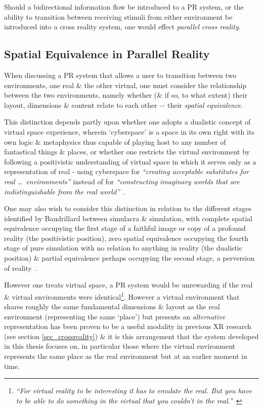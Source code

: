 Should a bidirectional information flow be introduced to a PR system, or the ability to transition between receiving stimuli from either environment be introduced into a cross reality system, one would effect \textit{parallel cross reality}.

\subsection{Spatial Equivalence in Parallel Reality}

\newcommand{\turklevrfootnote}{\footnote{\textit{``For virtual reality to be interesting it has to emulate the real. But you have to be able to do something in the virtual that you couldn't in the real.''}~\cite{Turkle1997}}}

When discussing a PR system that allows a user to transition between two environments, one real \& the other virtual, one must consider the relationship between the two environments, namely whether (\& if so, to what extent) their layout, dimensions \& content relate to each other $-$ their \textit{spatial equivalence}.

This distinction depends partly upon whether one adopts a dualistic concept of virtual space experience, wherein `cyberspace' is a space in its own right with its own logic \& metaphysics thus capable of playing host to any number of fantastical things \& places, or whether one restricts the virtual environment by following a positivistic understanding of virtual space in which it serves only as a representation of real - using cyberspace for \textit{``creating acceptable substitutes for real \ldots\ environments''} instead of for \textit{``constructing imaginary worlds that are indistinguishable from the real world''}~\cite{Qvortrup2002}.

One may also wish to consider this distinction in relation to the different stages identified by Baudrillard between simulacra \& simulation, with complete spatial equivalence occupying the first stage of a faithful image or copy of a profound reality (the positivistic position), zero spatial equivalence occupying the fourth stage of pure simulation with no relation to anything in reality (the dualistic position) \& partial equivalence perhaps occupying the second stage, a perversion of reality~\cite{Baudrillard1994}.


However one treats virtual space, a PR system would be unrewarding if the real \& virtual environments were identical\turklevrfootnote{}. However a virtual environment that shares roughly the same fundamental dimensions \& layout as the real environment (representing the same `place') but presents an \textit{alternative} representation has been proven to be a useful modality in previous XR research (see section \ref{sec_crossreality}) \& it is this arrangement that the system developed in this thesis focuses on, in particular those where the virtual environment represents the same place as the real environment but at an earlier moment in time.

